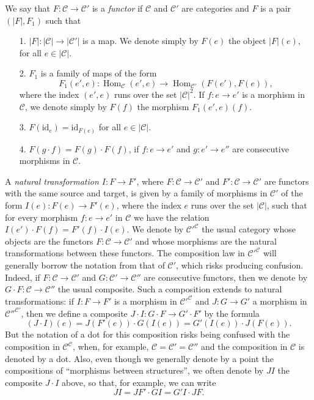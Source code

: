 \documentclass{article}
\newcommand{\oldpage}[1]{\marginpar{\footnotesize$\Big\vert$ \textit{p.~#1}}}
\newcommand{\cat}[1]{\mathcal{#1}}
\newcommand{\id}{\mathrm{id}}
\newcommand{\set}[1]{|#1|}
\DeclareMathOperator{\Hom}{Hom}
\begin{document}
We say that $F\colon\cat{C}\to\cat{C}'$ is a \emph{functor} if $\cat{C}$ and $\cat{C}'$ are categories and $F$ is a pair $(\set{F},F_1)$ such that

\begin{enumerate}
  \item[1\textquotesingle.] $\set{F}\colon\set{\cat{C}}\to\set{\cat{C}'}$ is a map.
    We denote simply by $F(e)$ the object $\set{F}(e)$, for all $e\in\set{\cat{C}}$.

  \item[2\textquotesingle.] $F_1$ is a family of maps of the form
    \[
      F_1(e',e)\colon
      \Hom_\cat{C}(e',e)
      \to \Hom_{\cat{C}'}(F(e'),F(e)),
    \]
    where the index $(e',e)$ runs over the set $\set{\cat{C}}^2$.
    If $f\colon e\to e'$ is a morphism in $\cat{C}$, we denote simply by $F(f)$ the morphism $F_1(e',e)(f)$.

  \item[3\textquotesingle.] $F(\id_e)=\id_{F(e)}$ for all $e\in\set{\cat{C}}$.

  \item[4\textquotesingle.] $F(g\cdot f)=F(g)\cdot F(f)$, if $f\colon e\to e'$ and $g\colon e'\to e''$ are consecutive morphisms in $\cat{C}$.
\end{enumerate}

A \emph{natural transformation $I\colon F\to F'$}, where $F\colon\cat{C}\to\cat{C}'$ and $F'\colon\cat{C}\to\cat{C}'$ are functors with the same source and target, is given by a family of morphisms in $\cat{C}'$ of the form $I(e)\colon F(e)\to F'(e)$, where the index $e$ runs over the set $\set{\cat{C}}$, such that for every morphism $f\colon e\to e'$ in $\cat{C}$ we have the relation $I(e')\cdot F(f)=F'(f)\cdot I(e)$.
\oldpage{221}
We denote by $\cat{C}'^{\cat{C}}$ the usual category whose objects are the functors $F\colon\cat{C}\to\cat{C}'$ and whose morphisms are the natural transformations between these functors.
The composition law in $\cat{C}'^{\cat{C}}$ will generally borrow the notation from that of $\cat{C}'$, which risks producing confusion.
Indeed, if $F\colon\cat{C}\to\cat{C}'$ and $G\colon\cat{C}'\to\cat{C}''$ are consecutive functors, then we denote by $G\cdot F\colon\cat{C}\to\cat{C}''$ the usual composite.
Such a composition extends to natural transformations: if $I\colon F\to F'$ is a morphism in $\cat{C}'^{\cat{C}}$ and $J\colon G\to G'$ a morphism in $\cat{C}''^{\cat{C}'}$, then we define a composite $J\cdot I\colon G\cdot F\to G'\cdot F'$ by the formula
\[
  (J\cdot I)(e)
  = J(F'(e))\cdot G(I(e))
  = G'(I(e))\cdot J(F(e)).
\]
But the notation of a dot for this composition risks being confused with the composition in $\cat{C}^\cat{C}$, when, for example, $\cat{C}=\cat{C}'=\cat{C}''$ and the composition in $\cat{C}$ is denoted by a dot.
Also, even though we generally denote by a point the compositions of ``morphisms between structures'', we often denote by $JI$ the composite $J\cdot I$ above, so that, for example, we can write
\[
  JI
  = JF'\cdot GI
  = G'I\cdot JF.
\]
\end{document}
